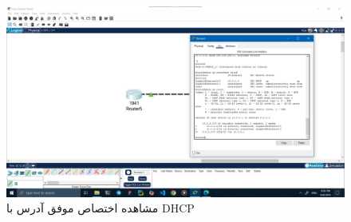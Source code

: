 \documentclass[12pt]{article}
\begin{document}
	\begin{figure}[H]
		\centering
		\includegraphics[width=\textwidth]{resources/scenario3-6.png}
		\caption{مشاهده اختصاص موفق آدرس با \textenglish{DHCP}}
		\label{3:6}
	\end{figure}
	
	\newpage
	\begin{LTR}
		\printbibliography[title={مراجع}]
	\end{LTR}
	
\end{document}
